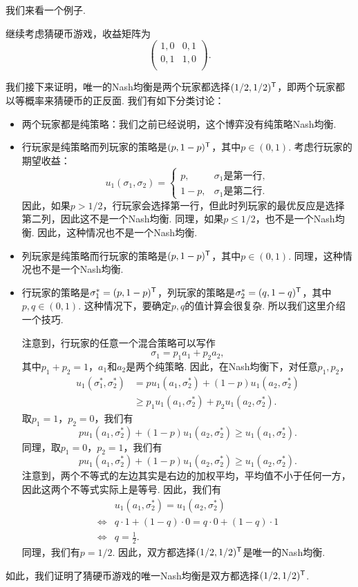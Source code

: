 我们来看一个例子. 
\begin{example}[猜硬币游戏的Nash均衡]
继续考虑猜硬币游戏，收益矩阵为
\[
\begin{pmatrix}
1,0&0,1\\
0,1&1,0\\
\end{pmatrix}.
\]

我们接下来证明，唯一的Nash均衡是两个玩家都选择$(1/2,1/2)^{\mathsf{T}}$，即两个玩家都以等概率来猜硬币的正反面. 我们有如下分类讨论：
\begin{itemize}
    \item 两个玩家都是纯策略：我们之前已经说明，这个博弈没有纯策略Nash均衡. 
    \item 行玩家是纯策略而列玩家的策略是$(p,1-p)^{\mathsf{T}}$，其中$p\in(0,1)$. 考虑行玩家的期望收益：
    \[
        u_1(\sigma_1,\sigma_2)=\begin{cases}
            p,&\text{$\sigma_1$是第一行},\\
            1-p,&\text{$\sigma_1$是第二行}.
        \end{cases}
    \]
    因此，如果$p>1/2$，行玩家会选择第一行，但此时列玩家的最优反应是选择第二列，因此这不是一个Nash均衡. 同理，如果$p\leq 1/2$，也不是一个Nash均衡. 因此，这种情况也不是一个Nash均衡.
    \item 列玩家是纯策略而行玩家的策略是$(p,1-p)^{\mathsf{T}}$，其中$p\in(0,1)$. 同理，这种情况也不是一个Nash均衡.
    \item 行玩家的策略是$\sigma_1^*=(p,1-p)^{\mathsf{T}}$，列玩家的策略是$\sigma_2^*=(q,1-q)^{\mathsf{T}}$，其中$p,q\in(0,1)$. 这种情况下，要确定$p,q$的值计算会很复杂. 所以我们这里介绍一个技巧. 
    
    注意到，行玩家的任意一个混合策略可以写作
    \[\sigma_1=p_1a_1+p_2a_2,\]
    其中$p_1+p_2=1$，$a_1$和$a_2$是两个纯策略. 因此，在Nash均衡下，对任意$p_1,p_2$，
    \[
    \begin{aligned}
        u_1(\sigma_1^*,\sigma_2^*)&=pu_1(a_1,\sigma_2^*)+(1-p)u_1(a_2,\sigma_2^*)\\
        &\geq p_1u_1(a_1,\sigma_2^*)+p_2u_1(a_2,\sigma_2^*).
    \end{aligned}
    \]
    取$p_1=1$，$p_2=0$，我们有
    \[pu_1(a_1,\sigma_2^*)+(1-p)u_1(a_2,\sigma_2^*)\geq u_1(a_1,\sigma_2^*).\]
    同理，取$p_1=0$，$p_2=1$，我们有
    \[pu_1(a_1,\sigma_2^*)+(1-p)u_1(a_2,\sigma_2^*)\geq u_1(a_2,\sigma_2^*).\]
    注意到，两个不等式的左边其实是右边的加权平均，平均值不小于任何一方，因此这两个不等式实际上是等号. 因此，我们有
    \begin{align*}
        &u_1(a_1,\sigma_2^*)=u_1(a_2,\sigma_2^*)\\
        \iff& q\cdot 1+(1-q)\cdot 0=q\cdot 0+(1-q)\cdot 1\\
        \iff& q=\frac{1}{2}.
    \end{align*}
    同理，我们有$p=1/2$. 因此，双方都选择$(1/2,1/2)^{\mathsf{T}}$是唯一的Nash均衡.
\end{itemize}
如此，我们证明了猜硬币游戏的唯一Nash均衡是双方都选择$(1/2,1/2)^{\mathsf{T}}$.
\end{example}

